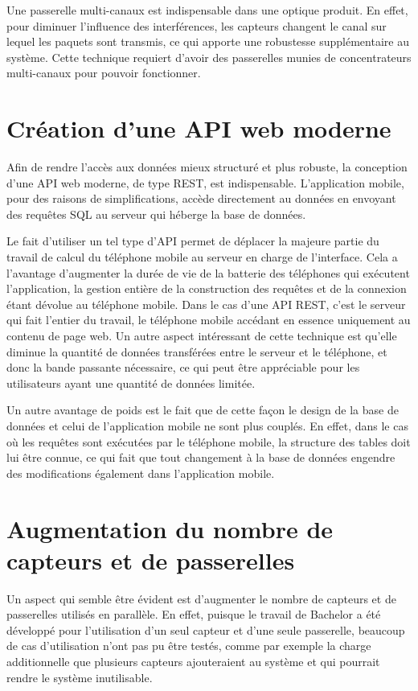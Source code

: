 Une passerelle multi-canaux est indispensable dans une optique produit. En effet, pour diminuer l’influence des interférences, les capteurs changent le canal sur lequel les paquets sont transmis, ce qui apporte une robustesse supplémentaire au système. Cette technique requiert d'avoir des passerelles munies de concentrateurs multi-canaux pour pouvoir fonctionner.

\section{Création d'une API web moderne}

Afin de rendre l'accès aux données mieux structuré et plus robuste, la conception d'une API web moderne, de type REST, est indispensable. L'application mobile, pour des raisons de simplifications, accède directement au données en envoyant des requêtes SQL au serveur qui héberge la base de données.

Le fait d'utiliser un tel type d'API permet de déplacer la majeure partie du travail de calcul du téléphone mobile au serveur en charge de l'interface. Cela a l'avantage d'augmenter la durée de vie de la batterie des téléphones qui exécutent l'application, la gestion entière de la construction des requêtes et de la connexion étant dévolue au téléphone mobile. Dans le cas d'une API REST, c'est le serveur qui fait l’entier du travail, le téléphone mobile accédant en essence uniquement au contenu de page web. Un autre aspect intéressant de cette technique est qu’elle diminue la quantité de données transférées entre le serveur et le téléphone, et donc la bande passante nécessaire, ce qui peut être appréciable pour les utilisateurs ayant une quantité de données limitée.

Un autre avantage de poids est le fait que de cette façon le design de la base de données et celui de l'application mobile ne sont plus couplés. En effet, dans le cas où les requêtes sont exécutées par le téléphone mobile, la structure des tables doit lui être connue, ce qui fait que tout changement à la base de données engendre des modifications également dans l'application mobile.

\section{Augmentation du nombre de capteurs et de passerelles}

Un aspect qui semble être évident est d'augmenter le nombre de capteurs et de passerelles utilisés en parallèle. En effet, puisque le travail de Bachelor a été développé pour l'utilisation d'un seul capteur et d'une seule passerelle, beaucoup de cas d'utilisation n'ont pas pu être testés, comme par exemple la charge additionnelle que plusieurs capteurs ajouteraient au système et qui pourrait rendre le système inutilisable.

